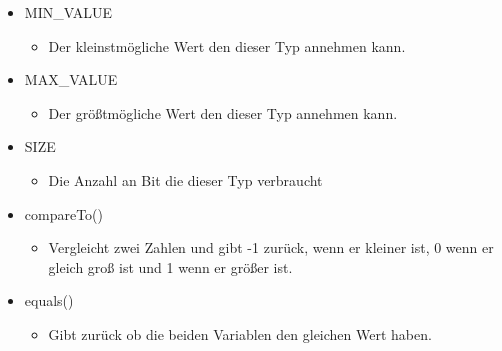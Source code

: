 \documentclass{article}
\begin{document}
	\begin{itemize}
		\item{MIN\_VALUE}
		\begin{itemize}
			\item{Der kleinstmögliche Wert den dieser Typ annehmen kann.}
		\end{itemize}
		\item{MAX\_VALUE}
		\begin{itemize}
			\item{Der größtmögliche Wert den dieser Typ annehmen kann.}
		\end{itemize}
		\item{SIZE}
		\begin{itemize}
			\item{Die Anzahl an Bit die dieser Typ verbraucht}
		\end{itemize}
		\item{compareTo()}
		\begin{itemize}
			\item{Vergleicht zwei Zahlen und gibt -1 zurück, wenn er kleiner ist, 0 wenn er gleich groß ist und 1 wenn er größer ist.}
		\end{itemize}
		\item{equals()}
		\begin{itemize}
			\item{Gibt zurück ob die beiden Variablen den gleichen Wert haben.}
		\end{itemize}
	\end{itemize}
\end{document}
